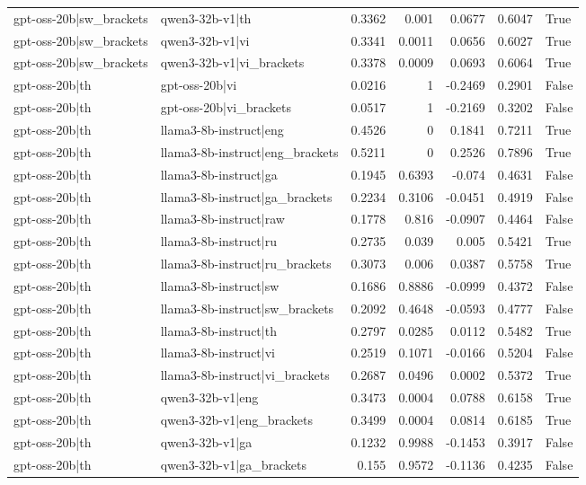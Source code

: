 \begin{table}
\begin{tabular}{l l r r r r l}
gpt-oss-20b|sw_brackets & qwen3-32b-v1|th & 0.3362 & 0.001 & 0.0677 & 0.6047 & True \\
gpt-oss-20b|sw_brackets & qwen3-32b-v1|vi & 0.3341 & 0.0011 & 0.0656 & 0.6027 & True \\
gpt-oss-20b|sw_brackets & qwen3-32b-v1|vi_brackets & 0.3378 & 0.0009 & 0.0693 & 0.6064 & True \\
gpt-oss-20b|th & gpt-oss-20b|vi & 0.0216 & 1 & -0.2469 & 0.2901 & False \\
gpt-oss-20b|th & gpt-oss-20b|vi_brackets & 0.0517 & 1 & -0.2169 & 0.3202 & False \\
gpt-oss-20b|th & llama3-8b-instruct|eng & 0.4526 & 0 & 0.1841 & 0.7211 & True \\
gpt-oss-20b|th & llama3-8b-instruct|eng_brackets & 0.5211 & 0 & 0.2526 & 0.7896 & True \\
gpt-oss-20b|th & llama3-8b-instruct|ga & 0.1945 & 0.6393 & -0.074 & 0.4631 & False \\
gpt-oss-20b|th & llama3-8b-instruct|ga_brackets & 0.2234 & 0.3106 & -0.0451 & 0.4919 & False \\
gpt-oss-20b|th & llama3-8b-instruct|raw & 0.1778 & 0.816 & -0.0907 & 0.4464 & False \\
gpt-oss-20b|th & llama3-8b-instruct|ru & 0.2735 & 0.039 & 0.005 & 0.5421 & True \\
gpt-oss-20b|th & llama3-8b-instruct|ru_brackets & 0.3073 & 0.006 & 0.0387 & 0.5758 & True \\
gpt-oss-20b|th & llama3-8b-instruct|sw & 0.1686 & 0.8886 & -0.0999 & 0.4372 & False \\
gpt-oss-20b|th & llama3-8b-instruct|sw_brackets & 0.2092 & 0.4648 & -0.0593 & 0.4777 & False \\
gpt-oss-20b|th & llama3-8b-instruct|th & 0.2797 & 0.0285 & 0.0112 & 0.5482 & True \\
gpt-oss-20b|th & llama3-8b-instruct|vi & 0.2519 & 0.1071 & -0.0166 & 0.5204 & False \\
gpt-oss-20b|th & llama3-8b-instruct|vi_brackets & 0.2687 & 0.0496 & 0.0002 & 0.5372 & True \\
gpt-oss-20b|th & qwen3-32b-v1|eng & 0.3473 & 0.0004 & 0.0788 & 0.6158 & True \\
gpt-oss-20b|th & qwen3-32b-v1|eng_brackets & 0.3499 & 0.0004 & 0.0814 & 0.6185 & True \\
gpt-oss-20b|th & qwen3-32b-v1|ga & 0.1232 & 0.9988 & -0.1453 & 0.3917 & False \\
gpt-oss-20b|th & qwen3-32b-v1|ga_brackets & 0.155 & 0.9572 & -0.1136 & 0.4235 & False \\

\end{tabular}
\end{table}
